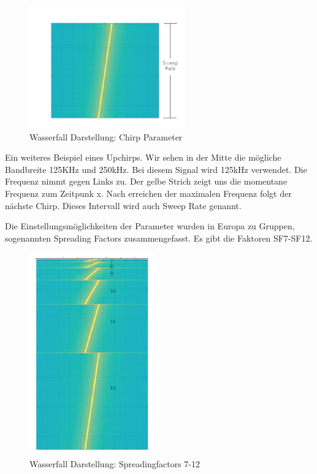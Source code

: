 \documentclass[11pt,english,german]{report}
\theoremstyle{definition}
\begin{document}
\begin{figure}[H]
	\centering
	\includegraphics[width=0.6\textwidth]{img/lora/chirp.jpg}
	\caption[Wasserfall Darstellung: Chirp Parameter]
	{Wasserfall Darstellung: Chirp Parameter}
\end{figure}

\noindent
Ein weiteres Beispiel eines Upchirps. Wir sehen in der Mitte die mögliche Bandbreite 125KHz und 250kHz. Bei diesem Signal wird 125kHz verwendet. Die Frequenz nimmt gegen Links zu. Der gelbe Strich zeigt uns die momentane Frequenz zum Zeitpunk x. Nach erreichen der maximalen Frequenz folgt der nächste Chirp. Dieses Intervall wird auch Sweep Rate genannt.

\newpage
\noindent
Die Einstellungsmöglichkeiten der Parameter wurden in Europa zu Gruppen, sogenannten Spreading Factors zusammengefasst. Es gibt die Faktoren SF7-SF12.

\begin{figure}[H]
	\centering
	\includegraphics[width=0.48\textwidth]{img/lora/spreadingfactors.jpg}
	\caption[Wasserfall Darstellung: Spreadingfactors 7-12]
	{Wasserfall Darstellung: Spreadingfactors 7-12}
\end{figure}
\end{document}
